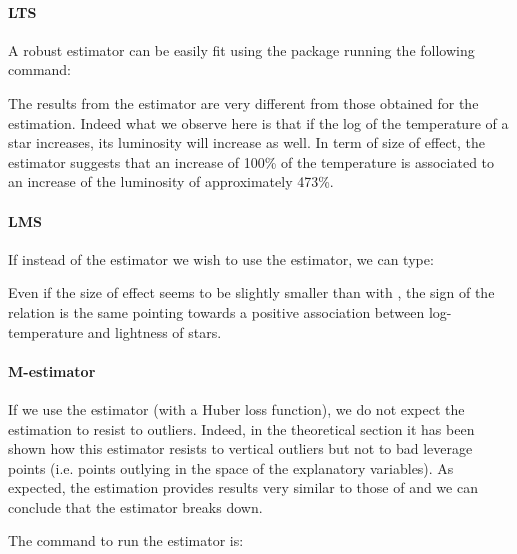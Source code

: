 \paragraph{LTS}

A robust  estimator can be easily fit using the  package 
running the following command:

\begin{stlog}

\end{stlog}

The results from the  estimator are
very different from those obtained for the  estimation. Indeed what we
observe here is that if the log of the temperature of a star increases, its
luminosity will increase as well. In term of size of effect, the  estimator
suggests that an increase of 100\% of the temperature is associated to an
increase of the luminosity of approximately 473\%.

\paragraph{LMS}

If instead of the  estimator we wish to use the  estimator,
we can type:

\begin{stlog}

\end{stlog}

Even if the size of effect seems to be slightly smaller than with ,
the sign of the relation is the same pointing towards a positive association
between log-temperature and lightness of stars.

\paragraph{M-estimator}

If we use the  estimator (with a Huber
loss function), we do not expect the estimation to resist to outliers. Indeed, 
in the theoretical section it has been shown how this
estimator resists to vertical outliers but not to bad leverage points (i.e.
points outlying in the space of the explanatory variables). As expected, the
 estimation provides results very similar to those of  and we can conclude
that the estimator breaks down.

The command to run the  estimator is:

\begin{stlog}

\end{stlog}


